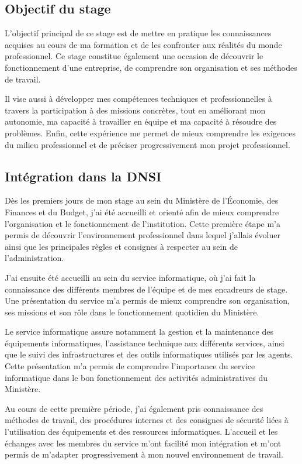 \documentclass[12pt,a4paper]{article}
\begin{document}
\subsection{Objectif du stage}

L’objectif principal de ce stage est de mettre en pratique les connaissances acquises au cours de ma formation et de les confronter aux réalités du monde professionnel. Ce stage constitue également une occasion de découvrir le fonctionnement d’une entreprise, de comprendre son organisation et ses méthodes de travail.

Il vise aussi à développer mes compétences techniques et professionnelles à travers la participation à des missions concrètes, tout en améliorant mon autonomie, ma capacité à travailler en équipe et ma capacité à résoudre des problèmes. Enfin, cette expérience me permet de mieux comprendre les exigences du milieu professionnel et de préciser progressivement mon projet professionnel.


\subsection{Intégration dans la DNSI}

Dès les premiers jours de mon stage au sein du Ministère de l’Économie, des Finances et du Budget, j’ai été accueilli et orienté afin de mieux comprendre l’organisation et le fonctionnement de l’institution. Cette première étape m’a permis de découvrir l’environnement professionnel dans lequel j’allais évoluer ainsi que les principales règles et consignes à respecter au sein de l’administration.

J’ai ensuite été accueilli au sein du service informatique, où j’ai fait la connaissance des différents membres de l’équipe et de mes encadreurs de stage. Une présentation du service m’a permis de mieux comprendre son organisation, ses missions et son rôle dans le fonctionnement quotidien du Ministère.

Le service informatique assure notamment la gestion et la maintenance des équipements informatiques, l’assistance technique aux différents services, ainsi que le suivi des infrastructures et des outils informatiques utilisés par les agents. Cette présentation m’a permis de comprendre l’importance du service informatique dans le bon fonctionnement des activités administratives du Ministère.

Au cours de cette première période, j’ai également pris connaissance des méthodes de travail, des procédures internes et des consignes de sécurité liées à l’utilisation des équipements et des ressources informatiques. L’accueil et les échanges avec les membres du service m’ont facilité mon intégration et m’ont permis de m’adapter progressivement à mon nouvel environnement de travail.
\end{document}
